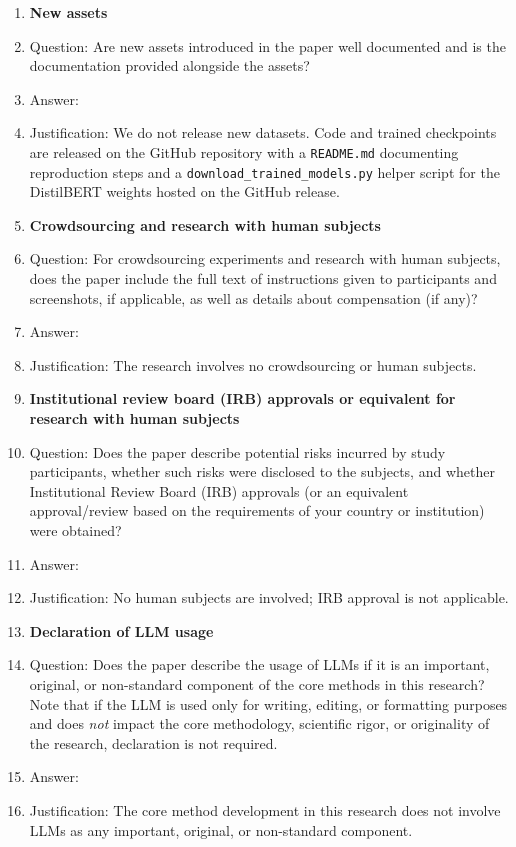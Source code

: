 \begin{enumerate}
\item {\bf New assets}
    \item[] Question: Are new assets introduced in the paper well documented and is the documentation provided alongside the assets?
    \item[] Answer: \answerNA{}
    \item[] Justification: We do not release new datasets. Code and trained checkpoints are released on the GitHub repository with a \texttt{README.md} documenting reproduction steps and a \texttt{download\_trained\_models.py} helper script for the DistilBERT weights hosted on the GitHub release.

\item {\bf Crowdsourcing and research with human subjects}
    \item[] Question: For crowdsourcing experiments and research with human subjects, does the paper include the full text of instructions given to participants and screenshots, if applicable, as well as details about compensation (if any)?
    \item[] Answer: \answerNA{}
    \item[] Justification: The research involves no crowdsourcing or human subjects.

\item {\bf Institutional review board (IRB) approvals or equivalent for research with human subjects}
    \item[] Question: Does the paper describe potential risks incurred by study participants, whether such risks were disclosed to the subjects, and whether Institutional Review Board (IRB) approvals (or an equivalent approval/review based on the requirements of your country or institution) were obtained?
    \item[] Answer: \answerNA{}
    \item[] Justification: No human subjects are involved; IRB approval is not applicable.

\item {\bf Declaration of LLM usage}
    \item[] Question: Does the paper describe the usage of LLMs if it is an important, original, or non-standard component of the core methods in this research? Note that if the LLM is used only for writing, editing, or formatting purposes and does \emph{not} impact the core methodology, scientific rigor, or originality of the research, declaration is not required.
    \item[] Answer: \answerNA{}
    \item[] Justification: The core method development in this research does not involve LLMs as any important, original, or non-standard component.

\end{enumerate}
